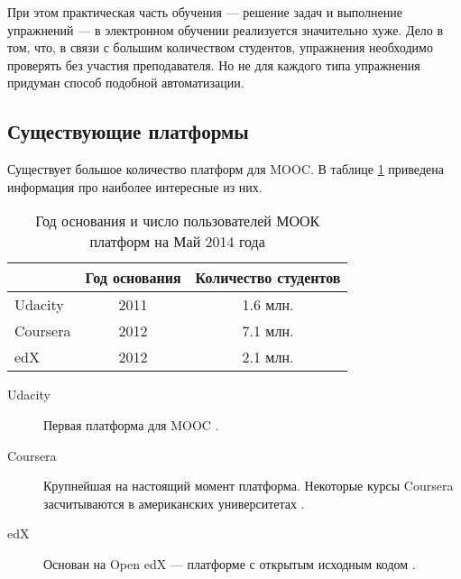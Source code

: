 \documentclass{matmex-diploma-custom}
\begin{document}
При этом практическая часть обучения --- решение задач и выполнение
упражнений --- в электронном обучении реализуется значительно хуже.
Дело в том, что, в связи с большим количеством студентов, упражнения
необходимо проверять без участия преподавателя. Но не для каждого типа
упражнения придуман способ подобной автоматизации.

\subsection*{Существующие платформы}

Существует большое количество платформ для MOOC. В таблице
\ref{table:platforms} приведена информация про наиболее интересные из
них.

\begin{table}[t]
  \centering
\begin{tabular}{|l|c|c|}
\hline
 & Год основания & Количество студентов \\
\hline
Udacity & 2011 & 1.6 млн. \\
Coursera & 2012 & 7.1 млн. \\
edX & 2012 & 2.1 млн. \\
\hline
\end{tabular}
  \caption{Год основания и число пользователей МООК платформ на Май
    2014 года}
   \label{table:platforms}
\end{table}

\iffalse
#+ORGTBL: SEND plat orgtbl-to-latex :splice nil :skip 0
|----------+---------------+----------------------------------|
|          | Год основания | Количество студентов             |
|----------+---------------+----------------------------------|
| Udacity  |          2011 | 1.6 млн.                         |
| Coursera |          2012 | 7.1 млн.                         |
| edX      |          2012 | 2.1 млн.                         |
|----------+---------------+----------------------------------|
\fi

\begin{description}
\item[Udacity] Первая платформа для MOOC \cite{udacity}.
\item[Coursera] Крупнейшая на настоящий момент
  платформа. Некоторые курсы Coursera засчитываются в американских
  университетах \cite{coursera}.
\item[edX] Основан на Open edX --- платформе с открытым исходным кодом
  \cite{edx}.
\end{description}
\end{document}
